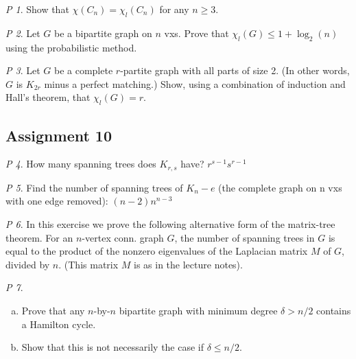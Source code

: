 \documentclass[11pt, fleqn, a4paper, landscape]{article}
\theoremstyle{plain} %
\theoremstyle{remark} %
\newtheorem{problem}{P}
\theoremstyle{definition} %
\begin{document}
\begin{multicols}{5}
\begin{problem}
Show that $\chi(C_n) = \chi_l(C_n)$ for any $n \ge 3$.
\end{problem}

\begin{problem}
Let $G$ be a bipartite graph on $n$ vxs. Prove that $\chi_l(G)\le 1 + \log_2(n)$ using the probabilistic method.
\end{problem}

\begin{problem}
Let $G$ be a complete $r$-partite graph with all parts of size 2. (In other words, $G$ is $K_{2r}$ minus a perfect matching.) Show, using a combination of induction and Hall's theorem, that $\chi_l(G) = r$.
\end{problem}

\subsection{Assignment 10}

\begin{problem}
How many spanning trees does $K_{r,s}$ have? $r^{s-1}s^{r-1}$
\end{problem}

\begin{problem}
Find the number of spanning trees of $K_n- e$ (the complete graph on n vxs with one edge removed): $(n-2)n^{n-3}$
\end{problem}

\begin{problem}
In this exercise we prove the following alternative form of the matrix-tree theorem. For an $n$-vertex conn. graph $G$, the number of spanning trees in $G$ is equal to the product of the  nonzero eigenvalues of the Laplacian matrix $M$ of $G$, divided by $n$. (This matrix $M$ is as in the lecture notes).
\end{problem}

\begin{problem}
\begin{enumerate}[(a)]
\item Prove that any $n$-by-$n$ bipartite graph with minimum degree $\delta > n/2$ contains a Hamilton cycle.
\item  Show that this is not necessarily the case if $\delta\le n/2$.
\end{enumerate}
\end{problem}


\end{multicols}
\end{document}
